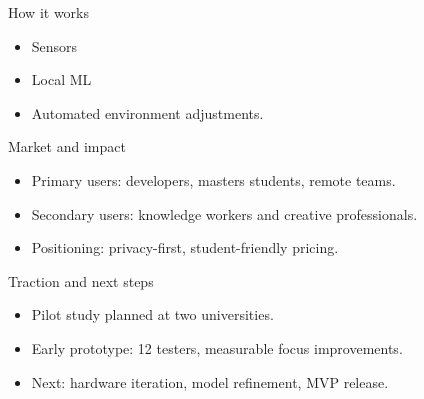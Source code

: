 \documentclass[10pt]{beamer}
\begin{document}
\begin{frame}{How it works}
    \vspace{0.2cm}
    \begin{itemize}
        \item Sensors 
        \item Local ML
        \item Automated environment adjustments.
    \end{itemize}
\end{frame}

\begin{frame}{Market and impact}
    \begin{itemize}
        \item Primary users: developers, masters students, remote teams.
        \item Secondary users: knowledge workers and creative professionals.
        \item Positioning: privacy-first, student-friendly pricing.
    \end{itemize}
    \vfill
\end{frame}

\begin{frame}{Traction and next steps}
    \begin{itemize}
        \item Pilot study planned at two universities.
        \item Early prototype: 12 testers, measurable focus improvements.
        \item Next: hardware iteration, model refinement, MVP release.
    \end{itemize}
    \vfill
\end{frame}
\end{document}

